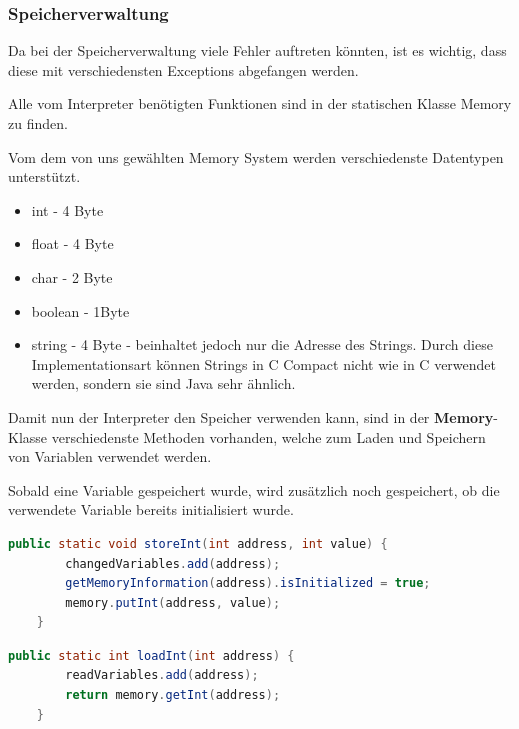 \subsubsection{Speicherverwaltung}
Da bei der Speicherverwaltung viele Fehler auftreten könnten, ist es wichtig, dass diese mit verschiedensten Exceptions abgefangen werden.

Alle vom Interpreter benötigten Funktionen sind in der statischen Klasse Memory zu finden. 

Vom dem von uns gewählten Memory System werden verschiedenste Datentypen unterstützt.
\begin{itemize}
 \item int - 4 Byte
 \item float - 4 Byte
 \item char - 2 Byte 
 \item boolean - 1Byte
 \item string - 4 Byte - beinhaltet jedoch nur die Adresse des Strings. Durch diese Implementationsart können Strings in C Compact nicht wie in C verwendet werden, sondern sie sind Java sehr ähnlich.
\end{itemize}
Damit nun der Interpreter den Speicher verwenden kann, sind in der \textbf{Memory}-Klasse verschiedenste Methoden vorhanden, welche zum Laden und Speichern von Variablen verwendet werden.

Sobald eine Variable gespeichert wurde, wird zusätzlich noch gespeichert, ob die verwendete Variable bereits initialisiert wurde.
\begin{lstlisting}[language=JAVA]
	public static void storeInt(int address, int value) {
		changedVariables.add(address);
		getMemoryInformation(address).isInitialized = true;
		memory.putInt(address, value);
	}
\end{lstlisting}

\begin{lstlisting}[language=JAVA]
	public static int loadInt(int address) {
		readVariables.add(address);
		return memory.getInt(address);
	}
\end{lstlisting} 

%

